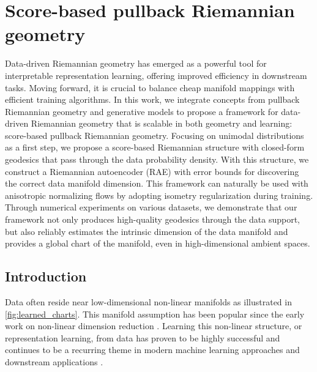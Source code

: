 
\chapter{Score-based pullback Riemannian geometry}

\ifpdf
    \graphicspath{{Chapter5/Figs/Raster/}{Chapter5/Figs/PDF/}{Chapter5/Figs/}}
\else
    \graphicspath{{Chapter5/Figs/Vector/}{Chapter5/Figs/}}
\fi

Data-driven Riemannian geometry has emerged as a powerful tool for interpretable representation learning, offering improved efficiency in downstream tasks. Moving forward, it is crucial to balance cheap manifold mappings with efficient training algorithms. In this work, we integrate concepts from pullback Riemannian geometry and generative models to propose a framework for data-driven Riemannian geometry that is scalable in both geometry and learning: score-based pullback Riemannian geometry. Focusing on unimodal distributions as a first step, we propose a score-based Riemannian structure with closed-form geodesics that pass through the data probability density. With this structure, we construct a Riemannian autoencoder (RAE) with error bounds for discovering the correct data manifold dimension. This framework can naturally be used with anisotropic normalizing flows by adopting isometry regularization during training. Through numerical experiments on various datasets, we demonstrate that our framework not only produces high-quality geodesics through the data support, but also reliably estimates the intrinsic dimension of the data manifold and provides a global chart of the manifold, even in high-dimensional ambient spaces.

\section{Introduction}

Data often reside near low-dimensional non-linear manifolds as illustrated in \ref{fig:learned_charts}. This manifold assumption \cite{fefferman2016testing} has been popular since the early work on non-linear dimension reduction \cite{belkin2001laplacian,coifman2006diffusion,roweis2000nonlinear,sammon1969nonlinear,tenenbaum2000global}. Learning this non-linear structure, or representation learning, from data has proven to be highly successful \cite{demers1992non,kingma2013auto} and continues to be a recurring theme in modern machine learning approaches and downstream applications \cite{chow2022predicting,gomari2022variational,ternes2022multi,vahdat2020nvae,zhong2021cryodrgn}. 

